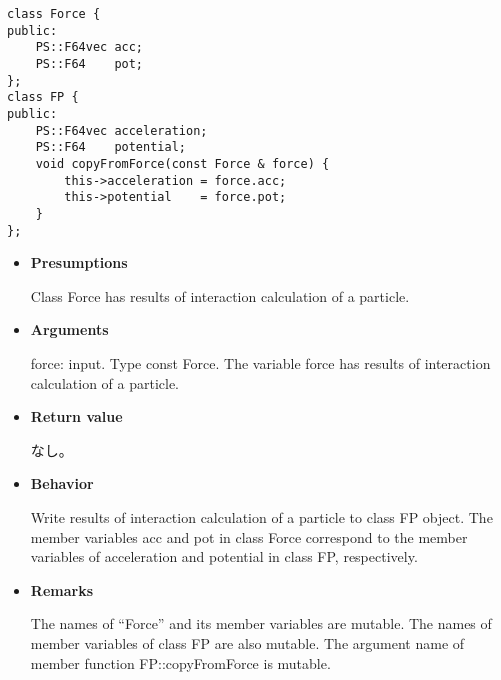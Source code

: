 \begin{screen}
\begin{verbatim}
class Force {
public:
    PS::F64vec acc;
    PS::F64    pot;
};
class FP {
public:
    PS::F64vec acceleration;
    PS::F64    potential;
    void copyFromForce(const Force & force) {
        this->acceleration = force.acc;
        this->potential    = force.pot;
    }
};
\end{verbatim}
\end{screen}

\begin{itemize}

\item {\bf Presumptions}

  Class Force has results of interaction calculation of a particle.

\item {\bf Arguments}

  force: input. Type const Force. The variable force has results of
  interaction calculation of a particle.
  
\item {\bf Return value}

  なし。
  
\item {\bf Behavior}

  Write results of interaction calculation of a particle to class FP
  object. The member variables acc and pot in class Force correspond
  to the member variables of acceleration and potential in class FP,
  respectively.
  
\item {\bf Remarks}

  The names of ``Force'' and its member variables are mutable. The
  names of member variables of class FP are also mutable. The argument
  name of member function FP::copyFromForce is mutable.

\end{itemize}


